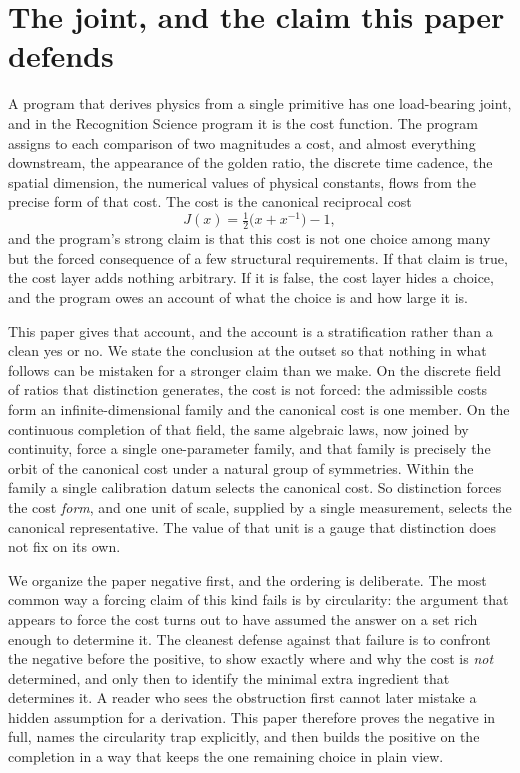 \documentclass[11pt,a4paper]{article}
\theoremstyle{definition}
\theoremstyle{remark}
\begin{document}
\tableofcontents

\section{The joint, and the claim this paper defends}

A program that derives physics from a single primitive has one load-bearing
joint, and in the Recognition Science program it is the cost function. The
program assigns to each comparison of two magnitudes a cost, and almost
everything downstream, the appearance of the golden ratio, the discrete time
cadence, the spatial dimension, the numerical values of physical constants,
flows from the precise form of that cost. The cost is the canonical reciprocal
cost
\[
  J(x) = \tfrac{1}{2}\bigl(x + x^{-1}\bigr) - 1 ,
\]
and the program's strong claim is that this cost is not one choice among many but
the forced consequence of a few structural requirements. If that claim is true,
the cost layer adds nothing arbitrary. If it is false, the cost layer hides a
choice, and the program owes an account of what the choice is and how large it
is.

This paper gives that account, and the account is a stratification rather than a
clean yes or no. We state the conclusion at the outset so that nothing in what
follows can be mistaken for a stronger claim than we make. On the discrete field
of ratios that distinction generates, the cost is not forced: the admissible
costs form an infinite-dimensional family and the canonical cost is one member.
On the continuous completion of that field, the same algebraic laws, now joined
by continuity, force a single one-parameter family, and that family is precisely
the orbit of the canonical cost under a natural group of symmetries. Within the
family a single calibration datum selects the canonical cost. So distinction
forces the cost \emph{form}, and one unit of scale, supplied by a single
measurement, selects the canonical representative. The value of that unit is a
gauge that distinction does not fix on its own.

We organize the paper negative first, and the ordering is deliberate. The most
common way a forcing claim of this kind fails is by circularity: the argument
that appears to force the cost turns out to have assumed the answer on a set rich
enough to determine it. The cleanest defense against that failure is to confront
the negative before the positive, to show exactly where and why the cost is
\emph{not} determined, and only then to identify the minimal extra ingredient
that determines it. A reader who sees the obstruction first cannot later mistake
a hidden assumption for a derivation. This paper therefore proves the negative in
full, names the circularity trap explicitly, and then builds the positive on the
completion in a way that keeps the one remaining choice in plain view.
\end{document}
